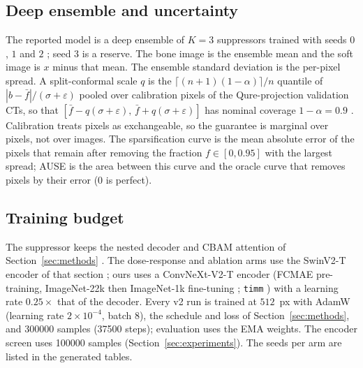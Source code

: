 \subsection{Deep ensemble and uncertainty}
The reported model is a deep ensemble of $K=3$ suppressors trained with seeds $0$, $1$ and $2$ \citep{lakshminarayanan2017ensembles}; seed $3$ is a reserve.
The bone image is the ensemble mean and the soft image is $x$ minus that mean. The ensemble standard deviation is the per-pixel spread. A split-conformal
scale $q$ is the $\lceil (n+1)(1-\alpha)\rceil/n$ quantile of $|b-\bar f|/(\sigma+\varepsilon)$ pooled over calibration pixels of the Qure-projection
validation CTs, so that $[\bar f-q(\sigma+\varepsilon),\,\bar f+q(\sigma+\varepsilon)]$ has nominal coverage $1-\alpha=0.9$
\citep{lei2018conformal,angelopoulos2023conformal}. Calibration treats pixels as exchangeable, so the guarantee is marginal over pixels, not
over images. The sparsification curve is the mean absolute error of the pixels that remain after removing the fraction $f\in[0,0.95]$ with the
largest spread; AUSE is the area between this curve and the oracle curve that removes pixels by their error (0 is perfect).

\subsection{Training budget}
The suppressor keeps the nested decoder and CBAM attention of Section~\ref{sec:methods} \citep{zhou2018unetpp,woo2018cbam}. The dose-response and
ablation arms use the SwinV2-T encoder of that section \citep{liu2022swinv2}; ours uses a ConvNeXt-V2-T encoder \citep{woo2023convnextv2}
(FCMAE pre-training, ImageNet-22k then ImageNet-1k fine-tuning \citep{deng2009imagenet}; \texttt{timm} \citep{wightman2019timm}
) with a learning
rate $0.25\times$ that of the decoder. Every v2 run is trained at $512$~px with AdamW \citep{loshchilov2019adamw} (learning rate $2\times10^{-4}$,
batch 8), the schedule and loss of Section~\ref{sec:methods}, and \num{300000} samples (\num{37500} steps); evaluation uses the EMA weights. The
encoder screen uses \num{100000} samples (Section~\ref{sec:experiments}). The seeds per arm are listed in the generated tables.
